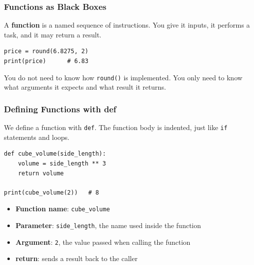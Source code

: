 \documentclass[aspectratio=169,10pt]{beamer}
\newcommand{\keyword}[1]{\textcolor{PrimaryBlue}{\textbf{#1}}}
\newcommand{\codeword}[1]{\texttt{#1}}
\begin{document}
\begin{frame}[fragile]
\frametitle{Functions as Black Boxes}
\small
A \keyword{function} is a named sequence of instructions. You give it inputs, it performs a task, and it may return a result.

\vspace{0.35cm}
\begin{center}
\end{center}

\vspace{0.15cm}
\begin{lstlisting}[style=pycode]
price = round(6.8275, 2)
print(price)      # 6.83
\end{lstlisting}

\begin{tcolorbox}[lecturebox,title=Key idea]
You do not need to know how \texttt{round()} is implemented. You only need to know what arguments it expects and what result it returns.
\end{tcolorbox}
\end{frame}

\begin{frame}[fragile]
\frametitle{Defining Functions with def}
\small
We define a function with \codeword{def}. The function body is indented, just like \codeword{if} statements and loops.

\vspace{0.2cm}
\begin{lstlisting}[style=pycode]
def cube_volume(side_length):
    volume = side_length ** 3
    return volume

print(cube_volume(2))   # 8
\end{lstlisting}

\begin{tcolorbox}[lecturebox,title=Vocabulary]
\begin{itemize}\setlength\itemsep{0.05cm}
  \item \keyword{Function name}: \texttt{cube\_volume}
  \item \keyword{Parameter}: \texttt{side\_length}, the name used inside the function
  \item \keyword{Argument}: \texttt{2}, the value passed when calling the function
  \item \keyword{return}: sends a result back to the caller
\end{itemize}
\end{tcolorbox}
\end{frame}
\end{document}
